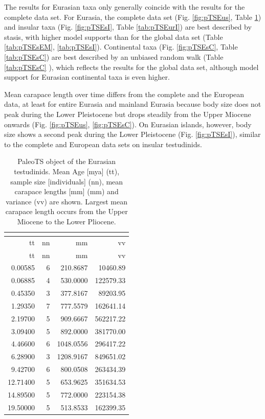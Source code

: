 The results for Eurasian taxa only generally coincide with the results for the complete data set. 
For Eurasia, the complete data set (Fig. \ref{fig:pTSEus}, Table \ref{tab:pTSEur}) and insular taxa (Fig. \ref{fig:pTSEsI}, Table \ref{tab:pTSEurI}) are best described by stasis, with higher model supports than for the global data set (Table \ref{tab:pTSEsEM}, \ref{tab:pTSEsI}). Continental taxa (Fig. \ref{fig:pTSEsC}, Table \ref{tab:pTSEsC}) are best described by an unbiased random walk (Table \ref{tab:pTSEsC} ), which reflects the results for the global data set, although model support for Eurasian continental taxa is even higher.


Mean carapace length over time differs from the complete and the European data, at least for entire Eurasia and mainland Eurasia because body size does not peak during the Lower Pleistocene but drops steadily from the Upper Miocene onwards (Fig. \ref{fig:pTSEus}, \ref{fig:pTSEsC}). On Eurasian islands, however, body size shows a second peak during the Lower Pleistocene (Fig. \ref{fig:pTSEsI}), similar to the complete and European data sets on insular testudinids.  


\begin{longtable}[]{@{}rrrr@{}}
	\caption[PaleoTS object of Eurasian \T]{PaleoTS object of the Eurasian testudinids. Mean Age [mya] (tt), sample size [individuals] (nn), mean carapace lengths [mm] (mm) and variance (vv) are shown. Largest mean carapace length occurs from the Upper Miocene to the Lower Pliocene.}
	\label{tab:pTSEur}\tabularnewline
	\toprule
	tt & nn & mm & vv\tabularnewline
	\midrule
	\endfirsthead
	\toprule
	tt & nn & mm & vv\tabularnewline
	\midrule
	\endhead
	0.00585 & 6 & 210.8687 & 10460.89\tabularnewline
	0.06885 & 4 & 530.0000 & 122579.33\tabularnewline
	0.45350 & 3 & 377.8167 & 89203.95\tabularnewline
	1.29350 & 7 & 777.5579 & 162641.14\tabularnewline
	2.19700 & 5 & 909.6667 & 562217.22\tabularnewline
	3.09400 & 5 & 892.0000 & 381770.00\tabularnewline
	4.46600 & 6 & 1048.0556 & 296417.22\tabularnewline
	6.28900 & 3 & 1208.9167 & 849651.02\tabularnewline
	9.42700 & 6 & 800.0508 & 263434.39\tabularnewline
	12.71400 & 5 & 653.9625 & 351634.53\tabularnewline
	14.89500 & 5 & 772.0000 & 223154.38\tabularnewline
	19.50000 & 5 & 513.8533 & 162399.35\tabularnewline
	\bottomrule
\end{longtable}


